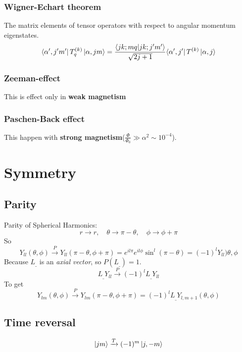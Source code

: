 \subsubsection{Wigner-Echart theorem}
The matrix elements of tensor operators with respect to angular momentum
eigenstates.
\begin{equation}
    \bra{\alpha^\prime,j^{\prime}m^\prime}T^{(k)}_{q}\ket{\alpha,jm}
    =\frac{\bra{jk;mq}\ket{jk;j^{\prime}m^\prime}}{\sqrt{2j+1}}{\bra{\alpha^\prime,j^\prime}T^{(k)}\ket{\alpha,j}}
\end{equation}

\subsubsection{Zeeman-effect}
This is effect only in \textbf{weak magnetism}

\subsubsection{Paschen-Back effect}
This happen with \textbf{strong magnetism}($\frac{\Phi}{\Phi_0}\gg\alpha^2\sim10^{-4}$).


\section{Symmetry}

\subsection{Parity} 
Parity of Spherical Harmonics:
\[
    r\rightarrow{}r,\quad\theta\rightarrow\pi-\theta,\quad\phi\rightarrow\phi+\pi
    \]
So
\[
    Y_{ll}(\theta,\phi)\xrightarrow{P}Y_{ll}(\pi-\theta,\phi+\pi)=e^{il\pi}e^{il\phi}\sin^l(\pi-\theta)=(-1)^{l}Y_{ll})\theta,\phi
    \]
Because $L_\_$ is an \emph{axial vector}, so $P(L_\_)=1$.
\[
    L_\_Y_{ll}\xrightarrow{P}(-1)^{l}L_\_Y_{ll}
    \]
To get
\[
    Y_{lm}(\theta,\phi)\xrightarrow{P}Y_{lm}(\pi-\theta,\phi+\pi)=(-1)^{l}L_\_Y_{l,m+1}(\theta,\phi)
    \]

\subsection{Time reversal}
\[
    \ket{jm}\xrightarrow{T}(-1)^m\ket{j,-m}
    \]



